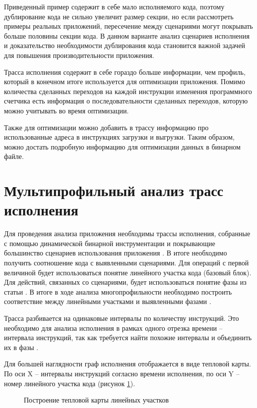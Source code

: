 Приведенный пример содержит в себе мало исполняемого кода, поэтому дублирование кода не сильно увеличит размер секции, но если рассмотреть примеры реальных приложений, пересечение между сценариями могут покрывать больше половины секции кода. В данном варианте анализ сценариев исполнения и доказательство необходимости дублирования кода становится важной задачей для повышения производительности приложения.

Трасса исполнения содержит в себе гораздо больше информации, чем профиль, который в конечном итоге используется для оптимизации приложения. Помимо количества сделанных переходов на каждой инструкции изменения программного счетчика есть информация о последовательности сделанных переходов, которую можно учитывать во время оптимизации.

Также для оптимизации можно добавить в трассу информацию про использованные адреса в инструкциях загрузки и выгрузки. Таким образом, можно достать подробную информацию для оптимизации данных в бинарном файле.

\section{Мультипрофильный анализ трасс исполнения}\label{sec:ch4/sect3}
Для проведения анализа приложения необходимы трассы исполнения, собранные с помощью динамической бинарной инструментации\cite{Rimsa2021} и покрывающие большинство сценариев использования приложения \cite{confbib3}. В итоге необходимо получить соотношение кода с выявленными сценариями. Для операций с первой величиной будет использоваться понятие линейного участка кода (базовый блок). Для действий, связанных со сценариями, будет использоваться понятие фазы из статьи \cite{Vandeputte2007}. В итоге в ходе анализа многопрофильности необходимо построить соответствие между линейными участками и выявленными фазами \cite{Lin2016}.

Трасса разбивается на одинаковые интервалы по количеству инструкций. Это необходимо для анализа исполнения в рамках одного отрезка времени – интервала инструкций, так как требуется найти похожие интервалы и объединить их в фазы \cite{Lebras2019}.

Для большей наглядности граф исполнения отображается в виде тепловой карты. По оси X – интервалы инструкций согласно времени исполнения, по оси Y – номер линейного участка кода (рисунок \cref{fig:HeatMap1}).

\begin{figure}[!h]
    \centerfloat{
        \texttt{[image: \_9]}
    }
    \caption{Построение тепловой карты линейных участков}\label{fig:HeatMap1}
\end{figure}

